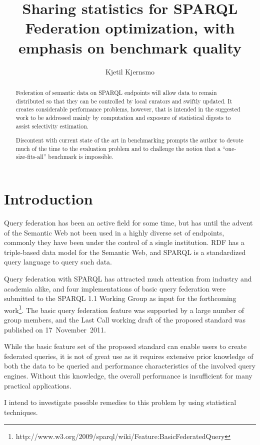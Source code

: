\documentclass{llncs}
\title{Sharing statistics for SPARQL Federation optimization, with
  emphasis on benchmark quality}
\author{Kjetil Kjernsmo\inst{1}}
\institute{Department of Informatics,
Postboks 1080 Blindern,
0316 Oslo, Norway
\email{kjekje@ifi.uio.no}}
\begin{document}
\maketitle



\begin{abstract}
Federation of semantic data on SPARQL endpoints will allow data to
remain distributed so that they can be controlled by local curators
and swiftly updated. It creates considerable performance problems,
however, that is intended in the suggested work to be addressed mainly
by computation and exposure of statistical digests to assist
selectivity estimation.

Discontent with current state of the art in benchmarking prompts the
author to devote much of the time to the evaluation problem and to
challenge the notion that a ``one-size-fits-all'' benchmark is
impossible.
\end{abstract}

\section{Introduction}

Query federation has been an active field for some time, but has until
the advent of the Semantic Web not been used in a highly diverse set
of endpoints, commonly they have been under the control of a single
institution. RDF has a triple-based data model for the Semantic Web,
and SPARQL is a standardized query language to query such data.

Query federation with SPARQL has attracted much attention
from industry and academia alike, and four implementations of basic
query federation were submitted to the SPARQL 1.1 Working Group as
input for the forthcoming
work\footnote{http://www.w3.org/2009/sparql/wiki/Feature:BasicFederatedQuery}. 
The basic query federation feature was
supported by a large number of group members, and the Last Call working
draft of the proposed standard was published on 17~November~2011.

While the basic feature set of the proposed standard can enable users
to create federated queries, it is not of great use as it requires
extensive prior knowledge of both the data to be queried and
performance characteristics of the involved query engines. Without
this knowledge, the overall performance is insufficient for many
practical applications.

I intend to investigate possible remedies to this problem by using
statistical techniques. 
\end{document}
